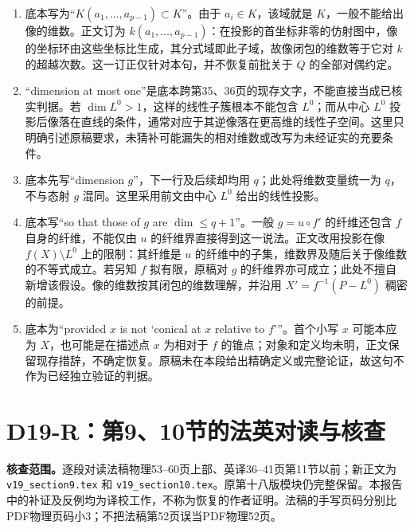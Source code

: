 \documentclass[UTF8,a4paper]{ctexbook}
\begin{document}
\begin{enumerate}
\item 底本写为“$K(a_1,\ldots,a_{p-1})\subset K$”。由于 $a_i\in K$，该域就是 $K$，一般不能给出像的维数。正文订为 $k(a_1,\ldots,a_{p-1})$：在投影的首坐标非零的仿射图中，像的坐标环由这些坐标比生成，其分式域即此子域，故像闭包的维数等于它对 $k$ 的超越次数。这一订正仅针对本句，并不恢复前批关于 $Q$ 的全部对偶约定。

\item “dimension at most one”是底本跨第35、36页的现存文字，不能直接当成已核实判据。若 $\dim L^0>1$，这样的线性子簇根本不能包含 $L^0$；而从中心 $L^0$ 投影后像落在直线的条件，通常对应于其逆像落在更高维的线性子空间。这里只明确引述原稿要求，未猜补可能漏失的相对维数或改写为未经证实的充要条件。

\item 底本先写“dimension $g$”，下一行及后续却均用 $q$；此处将维数变量统一为 $q$，不与态射 $g$ 混同。这里采用前文由中心 $L^0$ 给出的线性投影。

\item 底本写“so that those of $g$ are $\dim\le q+1$”。一般 $g=u\circ f'$ 的纤维还包含 $f$ 自身的纤维，不能仅由 $u$ 的纤维界直接得到这一说法。正文改用投影在像 $f(X)\setminus L^0$ 上的限制：其纤维是 $u$ 的纤维中的子集，维数界及随后关于像维数的不等式成立。若另知 $f$ 拟有限，原稿对 $g$ 的纤维界亦可成立；此处不擅自新增该假设。像的维数按其闭包的维数理解，并沿用 $X'=f^{-1}(P-L^0)$ 稠密的前提。

\item 底本为“provided $x$ is not ‘conical at $x$ relative to $f$’”。首个小写 $x$ 可能本应为 $X$，也可能是在描述点 $x$ 为相对于 $f$ 的锥点；对象和定义均未明，正文保留现存措辞，不确定恢复。原稿未在本段给出精确定义或完整论证，故这句不作为已经独立验证的判据。

\end{enumerate}
\par
\endgroup
\begingroup
\section*{D19-R：第9、10节的法英对读与核查}

\noindent\textbf{核查范围。}逐段对读法稿物理53--60页上部、英译36--41页第11节以前；新正文为 \texttt{v19\_section9.tex} 和 \texttt{v19\_section10.tex}。原第十八版模块仍完整保留。本报告中的补证及反例均为译校工作，不称为恢复的作者证明。法稿的手写页码分别比PDF物理页码小3；不把法稿第52页误当PDF物理52页。
\end{document}
